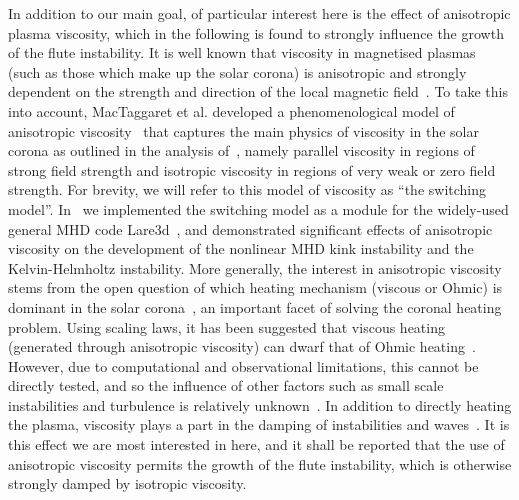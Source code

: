 \documentclass[fleqn,usenatbib]{mnras}
\begin{document}
In addition to our main goal, of particular interest here is the effect of
anisotropic plasma viscosity, which in the following is found to strongly
influence the growth of the flute instability. It is well known that viscosity
in magnetised plasmas (such as those which make up the solar corona) is
anisotropic and strongly dependent on the strength and direction of the local
magnetic
field~\citep{hollwegViscosityChewGoldbergerLowEquations1986,hollwegViscosityMagnetizedPlasma1985,braginskiiTransportProcessesPlasma1965}.
To take this into account, MacTaggaret et al. developed a phenomenological
model of anisotropic
viscosity~\citep{mactaggartBraginskiiMagnetohydrodynamicsArbitrary2017} that
captures the main physics of viscosity in the solar corona as outlined in the
analysis of~\cite{braginskiiTransportProcessesPlasma1965}, namely parallel
viscosity in regions of strong field  strength and isotropic viscosity in
regions of very weak or zero field strength. For brevity, we will refer to this
model of viscosity as ``the switching model''.
In~\citet{quinnEffectAnisotropicViscosity2020,quinnKelvinHelmholtzInstabilityCollapse2021}
we implemented the switching model as a module for the widely-used general MHD
code Lare3d~\citep{arberStaggeredGridLagrangian2001}, and demonstrated
significant effects of anisotropic viscosity on the development of the
nonlinear MHD kink instability and the Kelvin-Helmholtz instability. More
generally, the interest in anisotropic viscosity stems from the open question
of which heating mechanism (viscous or Ohmic) is dominant in the solar
corona~\citep{klimchukSolvingCoronalHeating2006}, an important facet of solving
the coronal heating problem. Using scaling laws, it has been suggested that
viscous heating (generated through anisotropic viscosity) can dwarf that of
Ohmic
heating~\citep{craigAnisotropicViscousDissipation2009a,litvinenkoViscousEnergyDissipation2005}.
However, due to computational and observational limitations, this cannot be
directly tested, and so the influence of other factors such as small scale
instabilities and turbulence is relatively
unknown~\citet{klimchukSolvingCoronalHeating2006}. In addition to directly
heating the plasma, viscosity plays a part in the damping of instabilities and
waves~\citep{rudermanSlowSurfaceWave2000}. It is this effect we are most
interested in here, and it shall be reported that the use of anisotropic
viscosity permits the growth of the flute instability, which is otherwise
strongly damped by isotropic viscosity.
\end{document}
